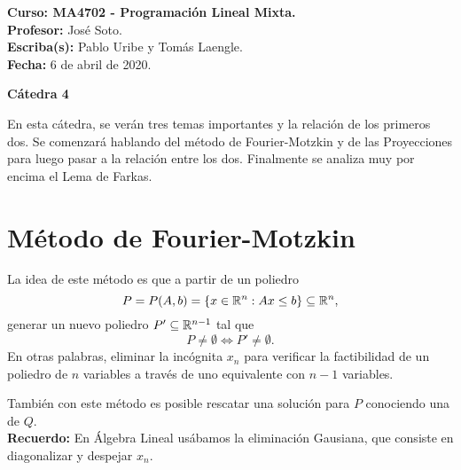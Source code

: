 

% 
\setlength{\headsep}{10pt}
\noindent
\textbf{Curso: MA4702 - Programación Lineal Mixta.} \\
\textbf{Profesor:} José Soto. \\
\textbf{Escriba(s): }Pablo Uribe y Tomás Laengle.\\
\textbf{Fecha: }6 de abril de 2020.
\begin{center}
    \huge\textbf{Cátedra 4}
\end{center}
\vspace{5pt}
En esta cátedra, se verán tres temas importantes y la relación de los primeros dos. Se comenzará hablando del método de Fourier-Motzkin y de las Proyecciones para luego pasar a la relación entre los dos. Finalmente se analiza muy por encima el Lema de Farkas.
\section{Método de Fourier-Motzkin}
La idea de este método es que a partir de un poliedro $$P=P(A,b)=\{x \in \mathbb{R}^n: Ax \le b\} \subseteq \mathbb{R}^n,$$
generar un nuevo poliedro $P' \subseteq \mathbb{R}^{n-1}$ tal que 
$$P \ne \emptyset \Longleftrightarrow P' \ne \emptyset.$$
En otras palabras, eliminar la incógnita $x_n$ para verificar la factibilidad de un poliedro de $n$ variables a través de uno equivalente con $n-1$ variables. 

También con este método es posible rescatar una solución para $P$ conociendo una de $Q$.\\

\textbf{Recuerdo: } En Álgebra Lineal usábamos la eliminación Gausiana, que consiste en diagonalizar y despejar $x_n$.\\

